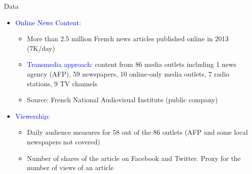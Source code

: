 \documentclass[english]{beamer}
\begin{document}
\begin{frame}{Data}
\begin{itemize}
    \setlength{\itemsep}{1.2em}
    \item \textcolor{blue}{Online News Content:}
    \vspace{4pt}
    \begin{itemize}
    \setlength{\itemsep}{0.6em}
        \item More than 2.5 million French news articles published online in 2013 (7K/day)
        \item \textcolor{blue}{Transmedia approach:}  content from 86 media outlets including 1 news agency (AFP), 59 newspapers, 10 online-only media outlets, 7 radio stations, 9 TV channels
        \item Source: French National Audiovisual Institute (public company)
    \end{itemize}
    
    \item  \textcolor{blue}{Viewership:}
   \vspace{4pt}
    \begin{itemize}
    \setlength{\itemsep}{0.4em}
        \item Daily audience measures for 58 out of the 86 outlets (AFP and some local newspapers not covered)
        \item Number of shares of the article on Facebook and Twitter. Proxy for the number of views of an article
    \end{itemize}
\end{itemize}
\end{frame}
\end{document}
